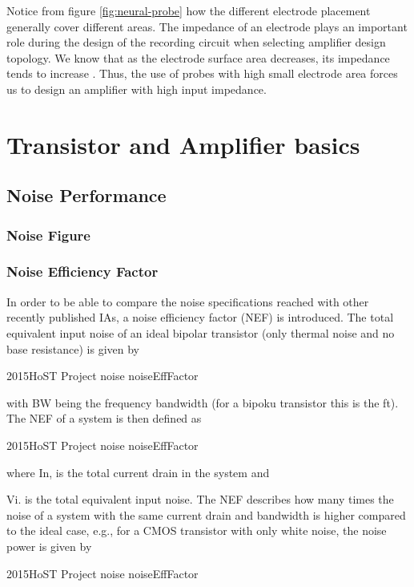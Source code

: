     Notice from figure \ref{fig:neural-probe} how the different electrode placement generally cover different areas. The impedance of an electrode plays an 
    important role during the design of the recording circuit when selecting amplifier design topology. We know that as the electrode surface 
    area decreases, its impedance tends to increase \cite{yoo2011biomedical-cmos}. Thus, the use of probes with high small electrode area
    forces us to design an amplifier with high input impedance.
   
   
   \section{Transistor and Amplifier basics}
    \label{subsec:trans-amp-basics}
      \subsection{Noise Performance}
	\subsubsection{Noise Figure}
        
        
	\subsubsection{Noise Efficiency Factor}
	In order to be able to compare the noise specifications
reached with other recently published IAs, a noise efficiency factor (NEF) is introduced. The total equivalent
input noise of an ideal bipolar transistor (only thermal
noise and no base resistance) is given by

2015HoST Project noise noiseEffFactor

with BW being the frequency bandwidth (for a bipoku
transistor this is the ft). The NEF of a system is then
defined as

2015HoST Project noise noiseEffFactor

where In, is the total current drain in the system and

Vi. is the total equivalent input noise. The NEF describes how many times the noise of a system with the
same current drain and bandwidth is higher compared to
the ideal case, e.g., for a CMOS transistor with only white
noise, the noise power is given by

2015HoST Project noise noiseEffFactor

  
